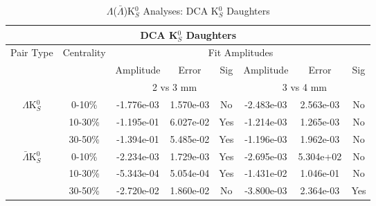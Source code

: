 \documentclass[../AnalysisNoteJBuxton.tex]{subfiles}
\begin{document}
\begin{table}
 \centering
 \begin{tabular}{|c|c|c|c|c||c|c|c|}
  \multicolumn{8}{c}{DCA K$^{0}_{S}$ Daughters} \\
  \hline
  \multirow{3}{*}{Pair Type} & \multirow{3}{*}{Centrality} & \multicolumn{6}{c|}{Fit Amplitudes} \\
  \cline{3-8}
   & & Amplitude & Error & Sig & Amplitude & Error & Sig \\  
  \cline{3-8}
   & & \multicolumn{3}{c||}{2 vs 3 mm} & \multicolumn{3}{c|}{3 vs 4 mm} \\  
  \hline  
  \multirow{3}{*}{$\Lambda$K$^{0}_{S}$}  
   &  0-10\% & -1.776e-03 & 1.570e-03 & No & -2.483e-03 & 2.563e-03 & No \\
   & 10-30\% & -1.195e-01 & 6.027e-02 & Yes & -1.214e-03 & 1.265e-03 & No \\
   & 30-50\% & -1.394e-01 & 5.485e-02 & Yes & -1.196e-03 & 1.962e-03 & No \\
  \hline  
  \multirow{3}{*}{$\bar{\Lambda}$K$^{0}_{S}$}  
   &  0-10\% & -2.234e-03 & 1.729e-03 & Yes & -2.695e-03 & 5.304e+02 & No \\
   & 10-30\% & -5.343e-04 & 5.054e-04 & Yes & -1.431e-02 & 1.046e-01 & No \\
   & 30-50\% & -2.720e-02 & 1.860e-02 & No & -3.800e-03 & 2.364e-03 & Yes \\
  \hline
 \end{tabular}
 \caption{$\Lambda$($\bar{\Lambda}$)K$^{0}_{S}$ Analyses: DCA K$^{0}_{S}$ Daughters}
 \label{tab:K0DaughtersDcaLamK0}
\end{table}
\end{document}
